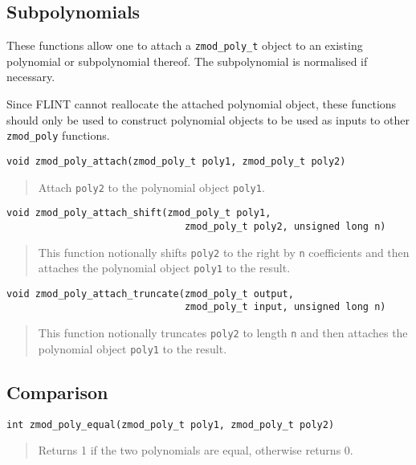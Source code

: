 \documentclass[a4paper,10pt]{article}
\newcommand{\code}{\lstinline}
\begin{document}
\subsection{Subpolynomials}
These functions allow one to attach a \code{zmod_poly_t} object to an existing polynomial or subpolynomial thereof. The subpolynomial is normalised if necessary.

Since FLINT cannot reallocate the attached polynomial object, these functions should only be used to construct polynomial objects to be used as inputs to other \code{zmod_poly} functions.

\begin{lstlisting}
void zmod_poly_attach(zmod_poly_t poly1, zmod_poly_t poly2)
\end{lstlisting}
\begin{quote}
Attach \code{poly2} to the polynomial object \code{poly1}.
\end{quote}

\begin{lstlisting}
void zmod_poly_attach_shift(zmod_poly_t poly1, 
                               zmod_poly_t poly2, unsigned long n)
\end{lstlisting}
\begin{quote}
This function notionally shifts \code{poly2} to the right by \code{n} coefficients and then attaches the polynomial object \code{poly1} to the result.
\end{quote}

\begin{lstlisting}
void zmod_poly_attach_truncate(zmod_poly_t output, 
                               zmod_poly_t input, unsigned long n)
\end{lstlisting}
\begin{quote}
This function notionally truncates \code{poly2} to length \code{n} and then attaches the polynomial object \code{poly1} to the result.
\end{quote}

\subsection{Comparison}
\begin{lstlisting}
int zmod_poly_equal(zmod_poly_t poly1, zmod_poly_t poly2)
\end{lstlisting}
\begin{quote}
Returns 1 if the two polynomials are equal, otherwise returns 0.
\end{quote}
\end{document}
